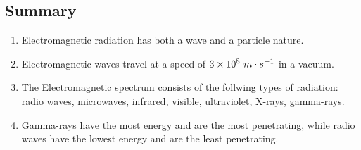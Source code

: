             \subsection{ Summary}
            \nopagebreak
      \label{m38779*id189769}\begin{enumerate}[noitemsep, label=\textbf{\arabic*}. ] 
            \label{m38779*uid30}\item Electromagnetic radiation has both a wave and a particle nature.
\label{m38779*uid31}\item Electromagnetic waves travel at a speed of $3\ensuremath{\times}{10}^{8}\phantom{\rule{3.33333pt}{0ex}}m\ensuremath{\cdot}{s}^{-1}$ in a vacuum.
\label{m38779*uid32}\item The Electromagnetic spectrum consists of the follwing types of radiation: radio waves, microwaves, infrared, visible, ultraviolet, X-rays, gamma-rays.
\label{m38779*uid33}\item Gamma-rays have the most energy and are the most penetrating, while radio waves have the lowest energy and are the least penetrating.
\end{enumerate}
    \label{m38779*eip-745}
